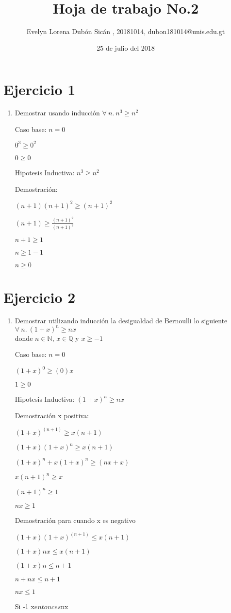 \documentclass{article}
\author{Evelyn Lorena Dubón Sicán , 20181014, dubon181014@unis.edu.gt}
\title{Hoja de trabajo No.2}
\date{25 de julio del 2018}
\begin{document}
\maketitle

\section{Ejercicio 1}
\begin{enumerate}
    \item Demostrar usando inducción  $\forall\ n.\ n^3\geq n^2$ \par
    Caso base: $n=0$ \par
    $ 0^3\geq 0^2$ \par
    $0\geq 0$ \par
    Hipotesis Inductiva: $ n^3\geq n^2\ $ \par
    Demostración: \par
    $(n+1)(n+1)^2 \geq (n+1)^2$ \par
    $(n+1)\geq \frac{(n+1)^2}{(n+1)^2}$ \par
    $n+1\geq 1$ \par
    $n\geq 1-1$ \par
    $n\geq 0$
\end{enumerate}

\section{Ejercicio 2}
\begin{enumerate}
    \item Demostrar utilizando inducci\'on la desigualdad de Bernoulli lo siguiente $\forall\ n.\ (1+x)^n\geq nx $\\donde $n\in \mathbb{N}$, $x\in \mathbb{Q}$ y $x\geq -1$ \par
    Caso base: $n=0$ \par
    $ (1+x)^0\geq (0)x$ \par
    $1\geq 0$\par
    Hipotesis Inductiva: $ (1+x)^n\geq nx\ $ \par
    Demostración x positiva: \par
    $(1+x)^{(n+1)} \geq x(n+1)$ \par
    $(1+x)(1+x)^n\geq x(n+1) $ \par
    $(1+x)^n+x(1+x)^n\geq (nx+x)$ \par
    $x(n+1)^n\geq x$ \par
    $(n+1)^n \geq 1$\par
    $nx \geq 1$\par
    Demostración para cuando x es negativo \par
    $(1+x)(1+x)^{(n+1)}\leq x(n+1)$\par 
    $(1+x)nx\leq x(n+1)$\par
    $(1+x)n\leq n+1$\par
    $n+nx\leq n+1$\par
    $nx\leq 1$ \par
    Si -1 \leq x$ entonces $nx
\end{enumerate}
\end{document}
